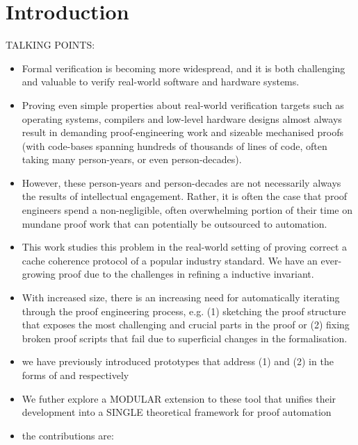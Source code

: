 \documentclass[10pt,conference]{IEEEtran}
\begin{document}
\section{Introduction}
\label{sec:intro}


TALKING POINTS:
\begin{itemize}
\item Formal verification is becoming more widespread, and it is both challenging and valuable to verify real-world software and hardware systems.
\item Proving even simple properties about real-world verification targets such as operating systems, compilers and low-level hardware designs almost always result in demanding proof-engineering work and sizeable mechanised proofs~\cite{cxlcacheformal,sel4,compcert,cakeml} (with code-bases spanning hundreds of thousands of lines of code, often taking many person-years, or even person-decades).
\item However, these person-years and person-decades are not necessarily always the results of intellectual engagement. Rather, it is often the case that proof engineers spend a non-negligible, often overwhelming portion of their time on mundane proof work that can potentially be outsourced to automation. 
\item This work studies this problem in the real-world setting of proving correct a cache coherence protocol of a popular industry standard. We have an ever-growing proof due to the challenges in refining a inductive invariant. 
\item With increased size, there is an increasing need for automatically iterating through the proof engineering process, e.g. (1) sketching the proof structure that exposes the most challenging and crucial parts in the proof or (2) fixing broken proof scripts that fail due to superficial changes in the formalisation.
\item we have previously introduced prototypes that address (1) and (2) in the forms of \supersketch{} and \superfix{} respectively~\cite{burdenProof} 
\item We futher explore a MODULAR extension to these tool that unifies their development into a SINGLE theoretical framework for proof automation
\item the contributions are:
\end{itemize}
\end{document}
